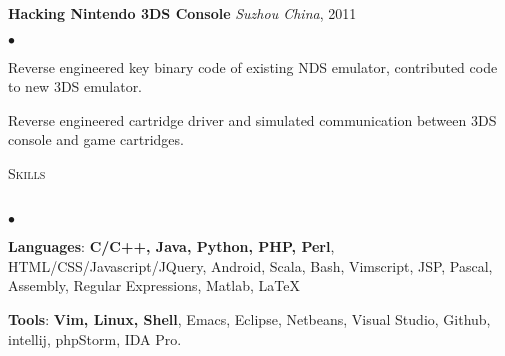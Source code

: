\documentclass[11pt]{article}
\newcommand{\td}{\textasciitilde}
\newcommand{\lineunder}{\vspace*{-8pt} \\ \hspace*{-18pt} \hrulefill \\}
\newcommand{\header}[2]{{\hspace*{-15pt}\vspace*{6pt} \textsc{\large #1}\hfill{\footnotesize #2}} \vspace*{-6pt} \lineunder}
\newcommand{\URL}[1] {\textbf{\scriptsize #1}}
\newcommand{\SC}[1] {\URL{(#1)}}
\newcommand{\project}[4]{{ \textbf{#1} \emph{#2}, #3
    \ifthenelse{\isempty{#4}}{}{\hfill \SC{#4}\\}   }}
\newenvironment{achievements}{\begin{list}{$\bullet$}{\topsep 0pt \itemsep -2pt}}{\vspace*{4pt}\end{list}}
\begin{document}
\project{Hacking Nintendo 3DS Console}{Suzhou China}{2011}{}
    \begin{achievements}
    \item Reverse engineered key binary code of existing NDS emulator, contributed code to new 3DS emulator.
    \item Reverse engineered cartridge driver and simulated communication between 3DS console and game cartridges.
    \end{achievements}

\header{Skills}{}
\begin{achievements}
\item \textbf{Languages}: \textbf{C/C++, Java, Python, PHP, Perl}, HTML/CSS/Javascript/JQuery, Android, Scala, Bash,
    Vimscript, JSP, Pascal, Assembly, Regular Expressions, Matlab, \LaTeX
\item \textbf{Tools}: \textbf{Vim, Linux, Shell}, Emacs, Eclipse, Netbeans, Visual Studio, Github, 
    intellij, phpStorm, IDA Pro.
\end{achievements}
\end{document}
